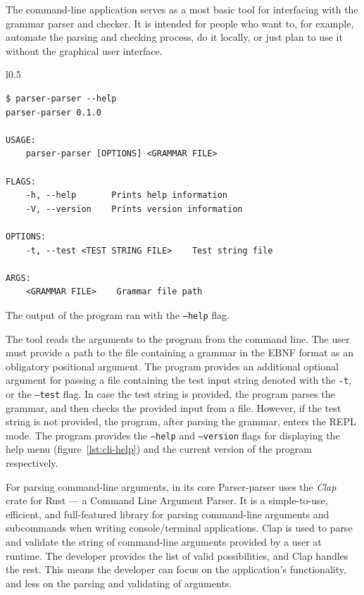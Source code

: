 \documentclass[english,engineering]{wizthesis}
\newcommand{\thisproject}{Parser-parser}
\begin{document}
The command-line application serves as a most basic tool for interfacing with
the grammar parser and checker. It is intended for people who want to, for
example, automate the parsing and checking process, do it locally, or just plan
to use it without the graphical user interface.

\begin{wraplisting}{l}{0.5\textwidth}
  \begin{verbatim}
$ parser-parser --help
parser-parser 0.1.0

USAGE:
    parser-parser [OPTIONS] <GRAMMAR FILE>

FLAGS:
    -h, --help       Prints help information
    -V, --version    Prints version information

OPTIONS:
    -t, --test <TEST STRING FILE>    Test string file

ARGS:
    <GRAMMAR FILE>    Grammar file path
  \end{verbatim}
  \caption{The output of the program ran with the \texttt{--help} flag.}
  \label{lst:cli-help}
\end{wraplisting}

The tool reads the arguments to the program from the command line. The user must
provide a path to the file containing a grammar in the EBNF format as an
obligatory positional argument. The program provides an additional optional
argument for passing a file containing the test input string denoted with the
\texttt{-t}, or the \texttt{--test} flag. In case the test string is provided,
the program parses the grammar, and then checks the provided input from a file.
However, if the test string is not provided, the program, after parsing the
grammar, enters the REPL mode. The program provides the \texttt{--help} and
\texttt{--version} flags for displaying the help menu
(figure~\ref{lst:cli-help}) and the current version of the program respectively.

For parsing command-line arguments, in its core \thisproject{} uses the
\emph{Clap} crate for Rust --- a Command Line Argument Parser. It is a
simple-to-use, efficient, and full-featured library for parsing command-line
arguments and subcommands when writing console/terminal applications. Clap is
used to parse and validate the string of command-line arguments provided by a
user at runtime. The developer provides the list of valid possibilities, and
Clap handles the rest. This means the developer can focus on the application's
functionality, and less on the parsing and validating of arguments.
\end{document}
